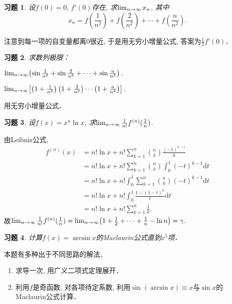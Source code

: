 \documentclass[11pt,a4paper]{ctexart}
\makeatletter
\theoremstyle{thmseries} %
\theoremstyle{exerseries}
\newtheorem{exer}{习题}[section]
\renewenvironment{proof}[1][\proofname]{\par
  \pushQED{\qed}%
  \normalfont \topsep6\p@\@plus6\p@\relax
  \trivlist
  \item[\hskip\labelsep
        \itshape
    #1\@addpunct{}]\ignorespaces
}{%
  \popQED\endtrivlist\@endpefalse
}
\newenvironment{sol}{\begin{proof}[\bfseries\upshape 解\quad]}{\end{proof}}
\newcommand{\bra}[1]{\mathopen{}\left(#1\right)}
\newcommand{\sbra}[1]{\mathopen{}\left[#1\right]}
\renewcommand{\d}{\mathrm{d}}
\def \nti {\mathnormal{n}\to\infty}
\makeatother
\begin{document}
\begin{exer}
	设$f(0)=0,\,f'(0)$存在, 求$\lim_{\nti}x_n$, 其中
	\[x_n=f\bra{\frac{1}{n^2}}+f\bra{\frac{2}{n^2}}+\cdots+f\bra{\frac{n}{n^2}}.\]
\end{exer}
\begin{sol}
	注意到每一项的自变量都离$0$很近, 于是用无穷小增量公式, 答案为$\frac{1}{2}f'(0)$．
\end{sol}

\begin{exer}
	求数列极限：
	\begin{enumerate}
	\end{enumerate}
\end{exer}
\begin{sol}
	用无穷小增量公式．
\end{sol}

\begin{exer}
	设$f(x)=x^n\ln x$, 求$\lim_{\nti}\frac{1}{n!}f^{(n)}(\frac{1}{n})$.
\end{exer}
\begin{sol}
	由Leibniz公式, 
	\begin{align*}
		f^{(n)}(x)&=n!\ln x+n!\sum_{k=1}^{n}\binom{n}{k}\frac{(-1)^{k-1}}{k}\\
		&=n!\ln x+n!\sum_{k=1}^{n}\binom{n}{k}\int_{0}^{1}(-t)^{k-1}\d t\\
		&=n!\ln x+n!\int_{0}^{1}\sum_{k=1}^{n}\binom{n}{k}(-t)^{k-1}\d t\\
		&=n!\ln x+n!\int_{0}^{1}\frac{1-(1-t)^n}{t}\d t\\
		&=n!\ln x+n!\sum_{k=1}^{n}\frac{1}{k}.
	\end{align*}
	故$\lim_{\nti}\frac{1}{n!}f^{(n)}(\frac{1}{n})=\lim_{\nti}\bra{1+\frac{1}{2}+\cdots+\frac{1}{n}-\ln n}=\gamma.$
\end{sol}

\begin{exer}
	计算$f(x)=\arcsin x$的Maclaurin公式直到$x^5$项．
\end{exer}
\begin{sol}
	本题有多种出于不同思路的解法．
	\begin{enumerate}
		\item 求导一次, 用广义二项式定理展开．
		\item 利用$f$是奇函数, 对各项待定系数, 利用$\sin(\arcsin x)\equiv x$与$\sin x$的Maclaurin公式计算．\qedhere
	\end{enumerate}
\end{sol}
\end{document}
